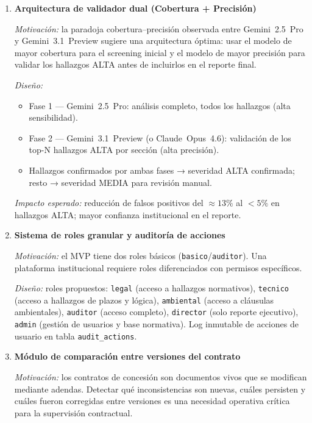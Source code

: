 \begin{enumerate}

    \item \textbf{Arquitectura de validador dual (Cobertura + Precisión)}

    \textit{Motivación:} la paradoja cobertura--precisión observada entre
    Gemini~2.5~Pro y Gemini~3.1~Preview sugiere una arquitectura óptima:
    usar el modelo de mayor cobertura para el screening inicial y el modelo
    de mayor precisión para validar los hallazgos ALTA antes de incluirlos
    en el reporte final.

    \textit{Diseño:}
    \begin{itemize}
        \item Fase 1 — Gemini~2.5~Pro: análisis completo, todos los
        hallazgos (alta sensibilidad).
        \item Fase 2 — Gemini~3.1~Preview (o Claude~Opus~4.6): validación
        de los top-N hallazgos ALTA por sección (alta precisión).
        \item Hallazgos confirmados por ambas fases → severidad ALTA
        confirmada; resto → severidad MEDIA para revisión manual.
    \end{itemize}

    \textit{Impacto esperado:} reducción de falsos positivos del $\approx 13\%$
    al $< 5\%$ en hallazgos ALTA; mayor confianza institucional en el reporte.

    \item \textbf{Sistema de roles granular y auditoría de acciones}

    \textit{Motivación:} el MVP tiene dos roles básicos
    (\texttt{basico}/\texttt{auditor}). Una plataforma institucional
    requiere roles diferenciados con permisos específicos.

    \textit{Diseño:} roles propuestos: \texttt{legal} (acceso a hallazgos
    normativos), \texttt{tecnico} (acceso a hallazgos de plazos y lógica),
    \texttt{ambiental} (acceso a cláusulas ambientales), \texttt{auditor}
    (acceso completo), \texttt{director} (solo reporte ejecutivo),
    \texttt{admin} (gestión de usuarios y base normativa).
    Log inmutable de acciones de usuario en tabla \texttt{audit\_actions}.

    \item \textbf{Módulo de comparación entre versiones del contrato}

    \textit{Motivación:} los contratos de concesión son documentos vivos
    que se modifican mediante adendas. Detectar qué inconsistencias son
    nuevas, cuáles persisten y cuáles fueron corregidas entre versiones
    es una necesidad operativa crítica para la supervisión contractual.


\end{enumerate}
